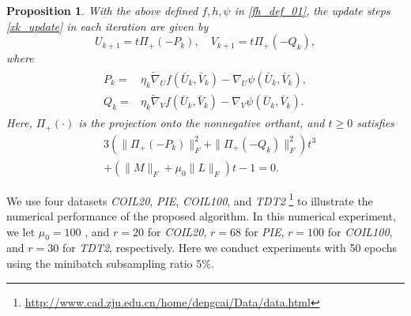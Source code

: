 \documentclass[letterpaper]{article} %
\newtheorem{proposition}{Proposition}
\begin{document}
	\begin{proposition}\label{Prop_GNMF}
		With the above defined $f,h,\psi$ in \eqref{fh_def_01}, the update steps \eqref{xk_update} in each iteration are given by
		\[
		U_{k+1}=t\Pi_{+}(-P_{k}),\quad V_{k+1}=t\Pi_{+}(-Q_{k}),
		\]
		where
		\begin{align}\label{eqn:pkqk}
			\begin{aligned}
				P_{k}=&\eta_{k}\tilde{\nabla}_{U}f(\bar{U}_{k},\bar{V}_{k})-\nabla_{U}\psi(\bar{U}_{k},\bar{V}_{k}),\\
				Q_{k}=&\eta_{k}\tilde{\nabla}_{V}f(\bar{U}_{k},\bar{V}_{k})-\nabla_{V}\psi(\bar{U}_{k},\bar{V}_{k}).
			\end{aligned}
		\end{align}
		Here, $\Pi_{+}(\cdot)$ is the projection onto the nonnegative orthant,  and $t\ge0$   satisfies
		\begin{align*}
			&3\left(\|\Pi_{+}(-P_{k})\|_{F}^{2}+\|\Pi_{+}(-Q_{k})\|_{F}^{2}\right)t^{3}\\
			&+(\|M\|_{F}+\mu_{0}\|L\|_{F})t-1=0.
		\end{align*}
	\end{proposition}

	We use four datasets \emph{COIL20}, \emph{PIE}, \emph{COIL100}, and \emph{TDT2} \footnote{\url{http://www.cad.zju.edu.cn/home/dengcai/Data/data.html}}   to illustrate the numerical performance of the proposed algorithm. In this numerical experiment, we let $\mu_{0}=100$ , and $r=20$ for \emph{COIL20}, $r=68$  for \emph{PIE}, $r=100$ for \emph{COIL100}, and $r=30$ for \emph{TDT2}, respectively.
	Here we conduct experiments  with 50 epochs using the minibatch subsampling ratio  $5\%$.

\end{document}
